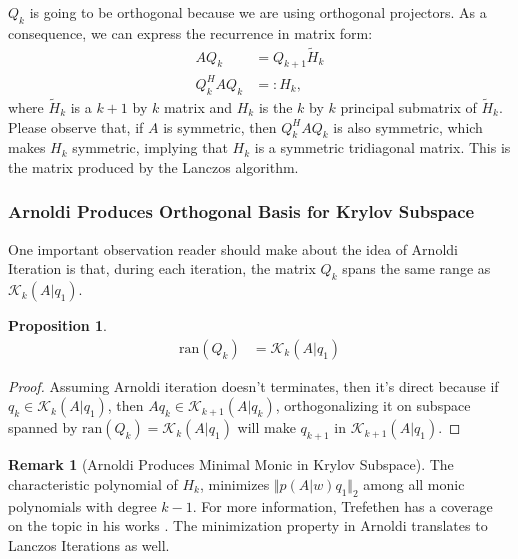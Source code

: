 \documentclass[]{article}
\theoremstyle{definition}
\newtheorem{prop}{Proposition}[section]  %
\newtheorem{remark}{Remark}[subsection]  %
\begin{document}
            $Q_k$ is going to be orthogonal because we are using orthogonal projectors. As a consequence, we can express the recurrence in matrix form: 
            \begin{align}
                AQ_{k} &= Q_{k + 1}\tilde{H}_k
                \\
                Q_{k}^HAQ_{k} &=: H_k ,
            \end{align}
            where $\tilde{H}_k$ is a $k+1$ by $k$ matrix and  $H_k$ is the $k$ by $k$ principal submatrix of $\tilde{H}_k$. Please observe that, if $A$ is symmetric, then $Q^H_kAQ_k$ is also symmetric, which makes $H_k$ symmetric, implying that $H_k$ is a symmetric tridiagonal matrix.  This is the matrix produced by the Lanczos algorithm.
        \subsubsection{Arnoldi Produces Orthogonal Basis for Krylov Subspace}
            One important observation reader should make about the idea of Arnoldi Iteration is that, during each iteration, the matrix $Q_k$ spans the same range as $\mathcal K_k(A|q_1)$. 
            \begin{prop}
                \begin{align}
                    \text{ran}(Q_k) &= \mathcal K_k(A|q_1)
                \end{align}
            \end{prop}
            \begin{proof}
                Assuming Arnoldi iteration doesn't terminates, then it's direct because if $q_k\in \mathcal K_k(A|q_1)$, then $Aq_k\in \mathcal K_{k + 1}(A|q_k)$, orthogonalizing it on subspace spanned by $\text{ran}(Q_{k}) = \mathcal K_k(A|q_1)$ will make $q_{k + 1}$ in $\mathcal K_{k + 1}(A|q_1)$. 
            \end{proof}
            \begin{remark}[Arnoldi Produces Minimal Monic in Krylov Subspace]\label{remark:Arnoldi_Produces_Minimal_Monic_in_Krylov_Subspace}
                The characteristic polynomial of $H_k$, minimizes $\Vert p(A|w)q_1\Vert_2$ among all monic polynomials with degree $k - 1$. For more information, Trefethen has a coverage on the topic in his works \cite{book:trefethen}. The minimization property in Arnoldi translates to Lanczos Iterations as well. 
            \end{remark}
\end{document}
